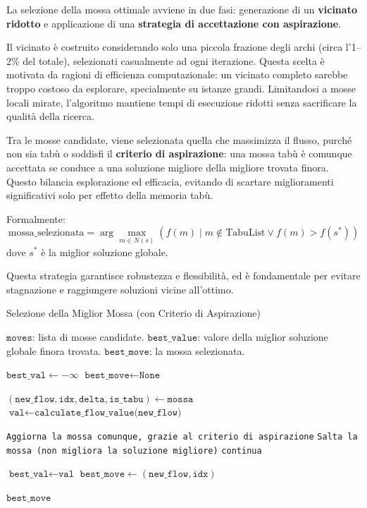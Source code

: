 \documentclass[12pt,a4paper]{article}
\begin{document}
La selezione della mossa ottimale avviene in due fasi: generazione di un \textbf{vicinato ridotto} e applicazione di una \textbf{strategia di accettazione con aspirazione}.

Il vicinato è costruito considerando solo una piccola frazione degli archi (circa l'1–2\% del totale), selezionati casualmente ad ogni iterazione. Questa scelta è motivata da ragioni di efficienza computazionale: un vicinato completo sarebbe troppo costoso da esplorare, specialmente su istanze grandi. Limitandosi a mosse locali mirate, l’algoritmo mantiene tempi di esecuzione ridotti senza sacrificare la qualità della ricerca.

Tra le mosse candidate, viene selezionata quella che massimizza il flusso, purché non sia tabù o soddisfi il \textbf{criterio di aspirazione}: una mossa tabù è comunque accettata se conduce a una soluzione migliore della migliore trovata finora. Questo bilancia esplorazione ed efficacia, evitando di scartare miglioramenti significativi solo per effetto della memoria tabù.

Formalmente:
\[
\text{mossa\_selezionata} = 
\arg\max_{m \in N(s)} 
\left( f(m) \mid m \notin \text{TabuList} \lor f(m) > f(s^*) \right)
\]
dove $ s^* $ è la miglior soluzione globale.

Questa strategia garantisce robustezza e flessibilità, ed è fondamentale per evitare stagnazione e raggiungere soluzioni vicine all’ottimo.

\begin{algorithm}[H]
\caption{Selezione della Miglior Mossa (con Criterio di Aspirazione)}
\label{alg:select_best_move_with_aspiration}
\begin{algorithmic}[1]
\REQUIRE $\texttt{moves}$: lista di mosse candidate.
\REQUIRE $\texttt{best\_value}$: valore della miglior soluzione globale finora trovata.
\ENSURE $\texttt{best\_move}$: la mossa selezionata.

\STATE $\texttt{best\_val} \gets -\infty$
\STATE $\texttt{best\_move} \gets \texttt{None}$

    \STATE $(\texttt{new\_flow}, \texttt{idx}, \texttt{delta}, \texttt{is\_tabu}) \gets \texttt{mossa}$
    \STATE $\texttt{val} \gets \texttt{calculate\_flow\_value(new\_flow)}$

        \STATE {}
            \STATE \texttt{Aggiorna la mossa comunque, grazie al criterio di aspirazione}
        \ELSE
            \STATE \texttt{Salta la mossa (non migliora la soluzione migliore)}
            \STATE \texttt{continua}
        \ENDIF
    \ENDIF

        \STATE $\texttt{best\_val} \gets \texttt{val}$
        \STATE $\texttt{best\_move} \gets (\texttt{new\_flow}, \texttt{idx})$
    \ENDIF
\ENDFOR

\RETURN $\texttt{best\_move}$
\end{algorithmic}
\end{algorithm}
\end{document}
